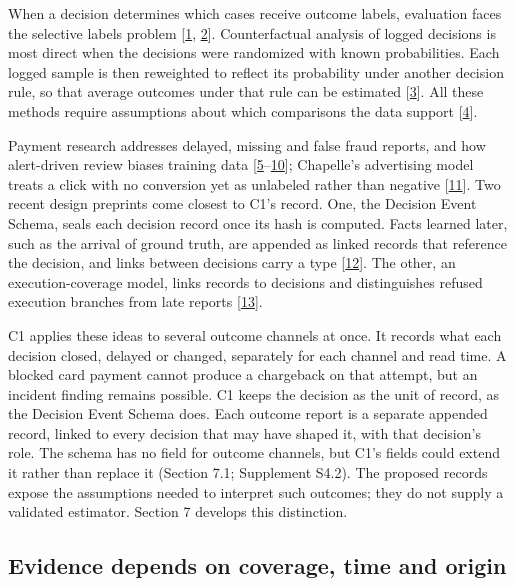 \documentclass[acmlarge,review,anonymous,nonacm]{acmart}
\begin{document}
When a decision determines which cases receive outcome labels,
evaluation faces the selective labels problem
{[}\protect\hyperlink{ref-Lakkaraju2017Selective}{1},
\protect\hyperlink{ref-Kilbertus2020Fair}{2}{]}. Counterfactual analysis
of logged decisions is most direct when the decisions were randomized
with known probabilities. Each logged sample is then reweighted to
reflect its probability under another decision rule, so that average
outcomes under that rule can be estimated
{[}\protect\hyperlink{ref-Bottou2013Counterfactual}{3}{]}. All these
methods require assumptions about which comparisons the data support
{[}\protect\hyperlink{ref-HernanRobins2020}{4}{]}.

Payment research addresses delayed, missing and false fraud reports, and
how alert-driven review biases training data
{[}\protect\hyperlink{ref-Cao2019TitAnt}{5}--\protect\hyperlink{ref-HeLoh2026Grab}{10}{]};
Chapelle's advertising model treats a click with no conversion yet as
unlabeled rather than negative
{[}\protect\hyperlink{ref-Chapelle2014Delayed}{11}{]}. Two recent design
preprints come closest to C1's record. One, the Decision Event Schema,
seals each decision record once its hash is computed. Facts learned
later, such as the arrival of ground truth, are appended as linked
records that reference the decision, and links between decisions carry a
type {[}\protect\hyperlink{ref-Solozobov2026DecisionTrace}{12}{]}. The
other, an execution-coverage model, links records to decisions and
distinguishes refused execution branches from late reports
{[}\protect\hyperlink{ref-Wu2026EvidenceCoverage}{13}{]}.

C1 applies these ideas to several outcome channels at once. It records
what each decision closed, delayed or changed, separately for each
channel and read time. A blocked card payment cannot produce a
chargeback on that attempt, but an incident finding remains possible. C1
keeps the decision as the unit of record, as the Decision Event Schema
does. Each outcome report is a separate appended record, linked to every
decision that may have shaped it, with that decision's role. The schema
has no field for outcome channels, but C1's fields could extend it
rather than replace it (Section 7.1; Supplement S4.2). The proposed
records expose the assumptions needed to interpret such outcomes; they
do not supply a validated estimator. Section 7 develops this
distinction.

\hypertarget{evidence-depends-on-coverage-time-and-origin}{%
\subsection{Evidence depends on coverage, time and
origin}\label{evidence-depends-on-coverage-time-and-origin}}
\end{document}
